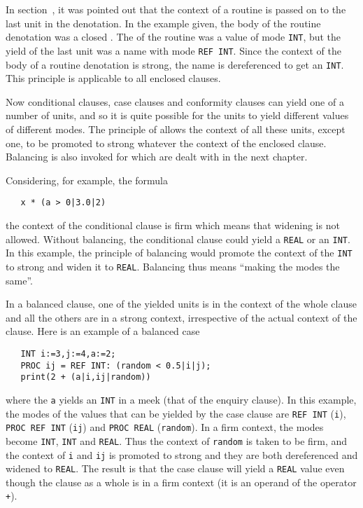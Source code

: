 In section~, it was pointed out that the context of a
routine  is passed on to the last
unit in the denotation.  In the example given, the body of the
routine denotation was a closed .  The
 of the routine was a value of mode \verb|INT|, but the
yield of the last unit was a name with mode \verb|REF INT|.  Since
the context of the body of a routine denotation is strong, the name
is dereferenced to get an \verb|INT|. This principle is applicable to
all enclosed clauses.

Now conditional clauses, case clauses and conformity clauses can
yield one of a number of units, and so it is quite possible for the
units to yield different values of different modes.  The principle of
 allows the context of all these units, except one, to
be promoted to strong whatever the context of the enclosed clause.
Balancing is also invoked for
 which are dealt with in
the next chapter.

Considering, for example, the formula
\begin{verbatim}
   x * (a > 0|3.0|2)
\end{verbatim}
\noindent
the context of the conditional clause is firm which means that widening
is not allowed. Without balancing, the conditional clause could yield a
\verb|REAL| or an \verb|INT|. In this example, the principle of
balancing would promote the context of the \verb|INT| to strong and
widen it to \verb|REAL|. Balancing thus means ``making the modes the
same''.

In a balanced clause, one of the yielded units is in the context of the
whole clause and all the others are in a strong context, irrespective
of the actual context of the clause. Here is an example of a balanced
case 
\begin{verbatim}
   INT i:=3,j:=4,a:=2;
   PROC ij = REF INT: (random < 0.5|i|j);
   print(2 + (a|i,ij|random))
\end{verbatim}
\noindent
where the \verb|a| yields an \verb|INT| in a meek
 (that of the enquiry clause). In this
example, the modes of the values that can be yielded by the case
clause are \verb|REF INT| (\verb|i|), \verb|PROC REF INT| (\verb|ij|)
and \verb|PROC REAL| (\verb|random|).  In a firm context, the modes
become \verb|INT|, \verb|INT| and \verb|REAL|. Thus the context of
\verb|random| is taken to be firm, and the context of \verb|i| and
\verb|ij| is promoted to strong and they are both dereferenced and
widened to \verb|REAL|.  The result is that the case clause will
yield a \verb|REAL| value even though the clause as a whole is in a
firm context (it is an operand of the operator \verb|+|).

